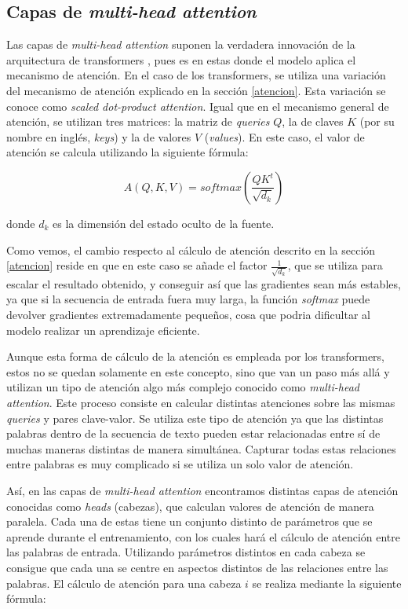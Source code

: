 \documentclass[11pt,spanish,listoffigures,listoftables]{tfgetsinf}
\begin{document}
\subsection{Capas de \textit{multi-head attention}}
Las capas de \textit{multi-head attention} suponen la verdadera innovación de la arquitectura de transformers \cite{jurafsky2023speech}, pues es en estas donde el modelo aplica el mecanismo de atención.  En el caso de los transformers, se utiliza una variación del mecanismo de atención explicado en la sección \ref{atencion}. Esta variación se conoce como \textit{scaled dot-product attention}. Igual que en el mecanismo general de atención, se utilizan tres matrices: la matriz de \textit{queries} $Q$, la de claves $K$ (por su nombre en inglés, \textit{keys}) y la de valores $V$ (\textit{values}). En este caso, el valor de atención se calcula utilizando la siguiente fórmula:

\begin{equation}
A(Q, K, V) = softmax(\frac{QK^t}{\sqrt{d_k}})
\end{equation}

donde $d_k$ es la dimensión del estado oculto de la fuente.

Como vemos, el cambio respecto al cálculo de atención descrito en la sección \ref{atencion} reside en que en este caso se añade el factor $\frac{1}{\sqrt{d_k}}$, que se utiliza para escalar el resultado obtenido, y conseguir así que las gradientes sean más estables, ya que si la secuencia de entrada fuera muy larga, la función \textit{softmax} puede devolver gradientes extremadamente pequeños, cosa que podria dificultar al modelo realizar un aprendizaje eficiente. \cite{multiheaddotproduct}

Aunque esta forma de cálculo de la atención es empleada por los transformers, estos no se quedan solamente en este concepto, sino que van un paso más allá y utilizan un tipo de atención algo más complejo conocido como \textit{multi-head attention}. Este proceso consiste en calcular distintas atenciones sobre las mismas \textit{queries} y pares clave-valor. Se utiliza este tipo de atención ya que las distintas palabras dentro de la secuencia de texto pueden estar relacionadas entre sí de muchas maneras distintas de manera simultánea. Capturar todas estas relaciones entre palabras es muy complicado si se utiliza un solo valor de atención.

Así, en las capas de \textit{multi-head attention} encontramos distintas capas de atención conocidas como \textit{heads} (cabezas), que calculan valores de atención de manera paralela. Cada una de estas tiene un conjunto distinto de parámetros que se aprende durante el entrenamiento, con los cuales hará el cálculo de atención entre las palabras de entrada. Utilizando parámetros distintos en cada cabeza se consigue que cada una se centre en aspectos distintos de las relaciones entre las palabras. El cálculo de atención para una cabeza $i$ se realiza mediante la siguiente fórmula:
\end{document}
